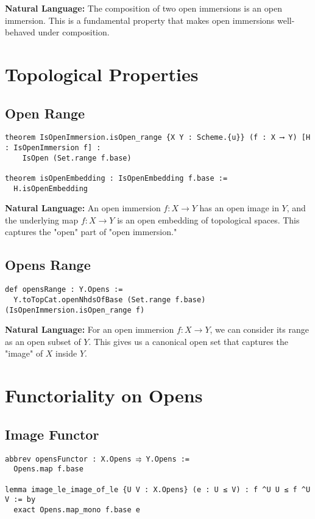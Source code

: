 \documentclass{article}
\theoremstyle{definition}
\begin{document}
\textbf{Natural Language:} The composition of two open immersions is an open immersion. This is a fundamental property that makes open immersions well-behaved under composition.

\section{Topological Properties}

\subsection{Open Range}

\begin{lstlisting}
theorem IsOpenImmersion.isOpen_range {X Y : Scheme.{u}} (f : X ⟶ Y) [H : IsOpenImmersion f] :
    IsOpen (Set.range f.base)

theorem isOpenEmbedding : IsOpenEmbedding f.base :=
  H.isOpenEmbedding
\end{lstlisting}

\textbf{Natural Language:} An open immersion $f: X \to Y$ has an open image in $Y$, and the underlying map $f: X \to Y$ is an open embedding of topological spaces. This captures the "open" part of "open immersion."

\subsection{Opens Range}

\begin{lstlisting}
def opensRange : Y.Opens :=
  Y.toTopCat.openNhdsOfBase (Set.range f.base) (IsOpenImmersion.isOpen_range f)
\end{lstlisting}

\textbf{Natural Language:} For an open immersion $f: X \to Y$, we can consider its range as an open subset of $Y$. This gives us a canonical open set that captures the "image" of $X$ inside $Y$.

\section{Functoriality on Opens}

\subsection{Image Functor}

\begin{lstlisting}
abbrev opensFunctor : X.Opens ⥤ Y.Opens :=
  Opens.map f.base

lemma image_le_image_of_le {U V : X.Opens} (e : U ≤ V) : f ^U U ≤ f ^U V := by
  exact Opens.map_mono f.base e
\end{lstlisting}
\end{document}
